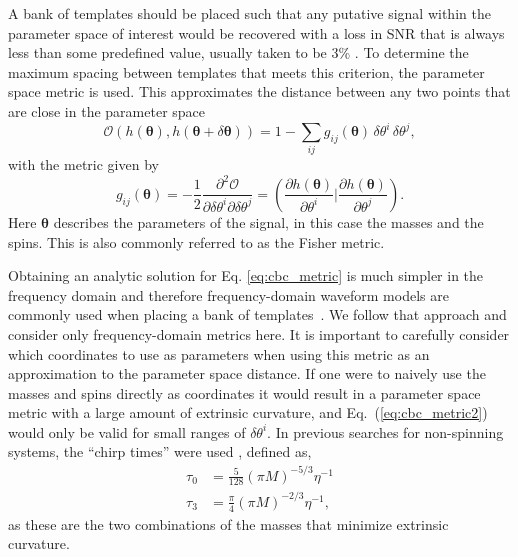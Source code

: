 A bank of templates should be placed such that any putative signal
within the parameter space of interest would be recovered with a loss in SNR
that is always
less than some predefined value, usually taken to be 3\%
\cite{Poisson:1995ef,Owen:1995tm,Owen:1998dk,Babak:2006ty,
Cokelaer:2007kx,Babak:2012zx}.
To determine the maximum spacing between templates that meets this criterion,
the parameter space metric is used. This approximates the distance between any
two points that are close in the parameter space \cite{Owen:1995tm}
%
\begin{equation}
\label{eq:cbc_metric2}
\mathcal{O}(h(\bm{\theta}),h(\bm{\theta}+\delta\bm{\theta})) =
  1 - \sum_{ij} g_{ij}(\bm{\theta}) \,\delta\theta^i \,\delta\theta^j,
\end{equation}
%
with the metric given by
\begin{equation}
\label{eq:cbc_metric}
g_{ij}(\boldsymbol{\theta}) = - \frac{1}{2} \frac{\partial^2
\mathcal{O}}{\partial \delta\theta^i \partial
\delta\theta^j} = \left(\frac{\partial h(\boldsymbol{\theta})}{\partial
\theta^i} \bigg|
\frac{\partial h(\boldsymbol{\theta})}{\partial \theta^j}\right).
\end{equation}
Here $\bm{\theta}$ describes the parameters of the signal, in this case the
masses and the spins. This is also commonly referred to as the Fisher metric. 

Obtaining an analytic solution for Eq. \ref{eq:cbc_metric} is much simpler in 
the frequency domain and therefore frequency-domain waveform models are 
commonly used when placing a bank of 
templates~\cite{Owen:1995tm,Owen:1998dk,Babak:2012zx}. We follow that approach 
and consider only frequency-domain metrics here. It is important to carefully 
consider which
coordinates to use as parameters when using this metric as an approximation to
the parameter space distance. If one were to naively use the masses and spins
directly as coordinates it
would result in a parameter space metric with a large amount of extrinsic
curvature, and Eq.~(\ref{eq:cbc_metric2})
would only be valid for small ranges of $\delta\theta^i$. In previous searches
for non-spinning systems,
the ``chirp times'' were used \cite{Owen:1998dk}, defined as,
%
\begin{subequations}
\begin{align}
 \tau_0 &= \frac{5}{128} \left(\pi M \right)^{-5/3} \eta^{-1} \\
 \tau_3 &= \frac{\pi}{4} \left(\pi M \right)^{-2/3} \eta^{-1},
\end{align}
\end{subequations}
%
as these are the two combinations of the masses that minimize extrinsic
curvature.

